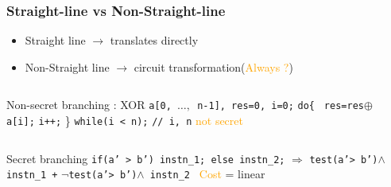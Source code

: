 \documentclass{beamer}
\begin{document}
\begin{frame} \frametitle{ Straight-line vs Non-Straight-line}
  \begin{itemize}
  \item Straight line $\rightarrow$ translates directly
  \item Non-Straight line $\rightarrow$ circuit transformation(\textcolor{orange}{Always ?})
  \end{itemize}
\begin{columns}
\begin{column}[c]{9cm}
\begin{exampleblock}{Non-secret branching : XOR}
\texttt{a[0, $\ldots,$ n-1], res=0, i=0;}
\newline \phantom{x} \texttt{do\{ }
\newline \phantom{x} \hspace{9ex} \texttt{res=res$\oplus$a[i];}
\newline \phantom{x} \hspace{9ex} \texttt{i++;} 
\newline   \phantom{x} \} \texttt{while(i < n);} \phantom{x} \hspace{9ex}\texttt{// i, n} \textcolor{orange}{not secret}
\end{exampleblock}
\end{column}
\begin{column}[c]{2cm}

\end{column}
\end{columns} 
\begin{alertblock}{Secret branching}
\texttt{if(a' > b') instn\_1; else instn\_2;}
\newline   \phantom{x}  \hspace{8ex} $\Rightarrow$ \texttt{test(a'> b')$\wedge$} \texttt{instn\_1 +} $\neg$\texttt{test(a'> b')$\wedge$ instn\_2 }
\newline \textcolor{orange}{Cost} = linear
\end{alertblock}
\end{frame}
\end{document}
